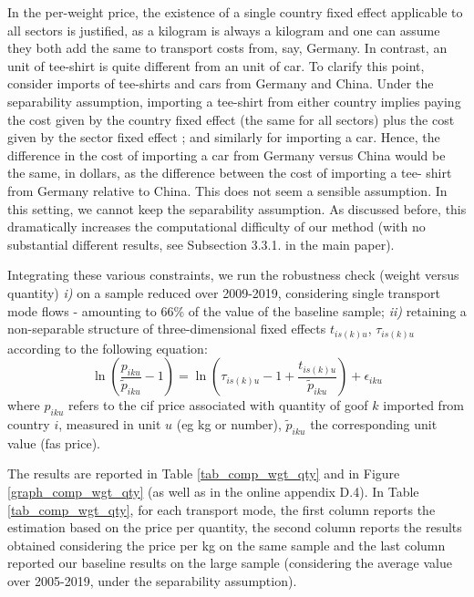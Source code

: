 \documentclass[a4paper,11pt]{article}
\begin{document}
In the per-weight price, the existence of a single country fixed effect applicable to all sectors is justified, as a kilogram is always a kilogram and one can assume they both add the same to transport costs from, say, Germany. In contrast, an unit of tee-shirt is quite different from an unit of car. To clarify this point, consider imports of tee-shirts and cars from
Germany and China. Under the separability assumption, importing a tee-shirt from either country implies paying the cost given by the  country fixed effect (the same for all sectors) plus the cost given by
the sector fixed effect ; and similarly for importing a car.
Hence, the difference in the cost of importing a car from Germany versus China would be the same, in dollars, as the difference between the cost of importing a tee- shirt from Germany relative to China. This does not seem a sensible assumption.
In this setting, we cannot keep the separability assumption.
As discussed before, this dramatically increases the computational difficulty of our method (with no substantial different results, see Subsection 3.3.1. in the main paper).\smallskip

Integrating these various constraints, we run the robustness check (weight versus quantity) \textit{i)} on a sample reduced over 2009-2019, considering single transport mode flows - amounting to 66\% of the value of the baseline sample; \textit{ii)} retaining a non-separable structure of three-dimensional fixed effects $t_{is(k)u}$, $\tau_{is(k)u}$ according to the following equation:
\begin{equation*}
\ln\left(\frac{p_{iku}}{\widetilde{p}_{iku}}-1 \right)= \ln \left(\tau_{is(k)u} -1+\frac{t_{is(k)u} }{\widetilde{p}_{iku}} \right) + \epsilon_{iku}
\end{equation*}
\noindent where $p_{iku}$ refers to the cif price associated with quantity of goof $k$ imported from country $i$, measured in unit $u$ (eg kg or number), $\widetilde{p}_{iku}$ the corresponding unit value (fas price).

The results are reported in Table \ref{tab_comp_wgt_qty} and in Figure \ref{graph_comp_wgt_qty} (as well as in the online appendix D.4). In Table \ref{tab_comp_wgt_qty}, for each transport mode, the first column reports the estimation based on the price per quantity, the second column reports the results obtained considering the price per kg on the same sample and the last column reported our baseline results on the large sample (considering the average value over 2005-2019, under the separability assumption).
\end{document}
